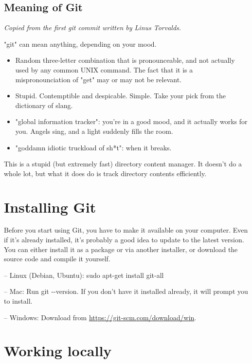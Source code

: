\documentclass[12pt,a4]{article}
\newcommand{\ilcode}[1]{\textcolor[RGB]{160, 110, 220}{#1}}
\begin{document}
\subsection{Meaning of Git}
\vspace*{-10pt}
\emph{Copied from the first git commit written by Linus Torvalds.}

"git" can mean anything, depending on your mood.
\begin{itemize}
\vspace*{-10pt}
\item Random three-letter combination that is pronounceable, and not actually
	used by any common UNIX command. The fact that it is a mispronounciation of
	"get" may or may not be relevant.
\vspace*{-3pt}
\item Stupid. Contemptible and despicable. Simple. Take your pick from the
	dictionary of slang.
\vspace*{-3pt}
\item "global information tracker": you're in a good mood, and it actually
   works for you. Angels sing, and a light suddenly fills the room.
\vspace*{-3pt}
\item "goddamn idiotic truckload of sh*t": when it breaks.
\vspace*{-10pt}
\end{itemize}

This is a stupid (but extremely fast) directory content manager. It doesn't do
a whole lot, but what it does do is track directory contents efficiently.

\section{Installing Git}
Before you start using Git, you have to make it available on your computer. Even
if it’s already installed, it’s probably a good idea to update to the latest
version. You can either install it as a package or via another installer, or
download the source code and compile it yourself.

{\sf -- Linux (Debian, Ubuntu):} \ilcode{sudo apt-get install git-all}

{\sf -- Mac:} Run \ilcode{git -{}-version}. If you don’t have it installed
already, it will prompt you to install.

{\sf -- Windows:} Download from \url{https://git-scm.com/download/win}.

\section{Working locally}
\end{document}
